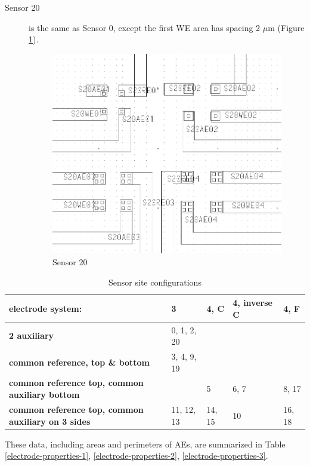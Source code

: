 \begin{description}
\item[Sensor 20] is the same as Sensor 0, except the first WE area has spacing 2 $\mu \mathrm{m}$ (Figure \ref{s20}).

\begin{figure}
	\centering
	\includegraphics[width=0.3\linewidth]{figures/s20.png}
	\caption{Sensor 20}
	\label{s20}
\end{figure}

\end{description}

\begin{table}
	\begin{tabular}{p{4cm}|p{2cm}|p{2cm}|p{2.5cm}|p{2cm}}
		electrode system: & \textbf{3} & \textbf{4, C} & \textbf{4, inverse C} & \textbf{4, F} \\
		\hline
		\textbf{2 auxiliary} & 0, 1, 2, 20 & & & \\
		\hline
		\textbf{common reference, top \& bottom} & 3, 4, 9, 19 & & & \\
		\hline
		\textbf{common reference top, common auxiliary bottom} & & 5 & 6, 7 & 8, 17 \\
		\hline
		\textbf{common reference top, common auxiliary on 3 sides} & 11, 12, 13 & 14, 15 & 10 & 16, 18
	\end{tabular}
	\caption{Sensor site configurations}
	\label{sensor-config}
\end{table}

These data, including areas and perimeters of AEs, are summarized in Table \ref{electrode-properties-1}, \ref{electrode-properties-2}, \ref{electrode-properties-3}.

